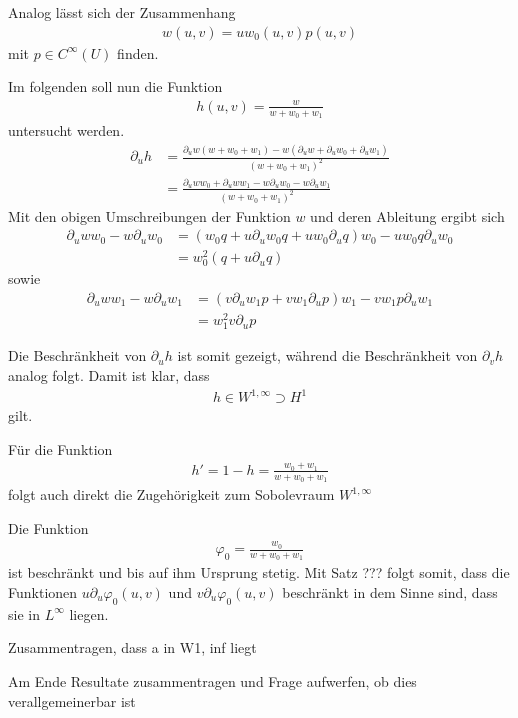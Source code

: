 \documentclass[10pt,a4paper,oneside]{report}
\begin{document}
Analog lässt sich der Zusammenhang
\begin{align*}
w\left(u,v\right) = u w_0\left(u,v\right) p\left(u,v\right)
\end{align*}
mit $p \in C^\infty\left(U\right)$ finden.

Im folgenden soll nun die Funktion
\begin{align*}
h\left(u,v\right) = \frac{w}{w + w_0 + w_1}
\end{align*}
untersucht werden.
\begin{align*}
\partial_u h &= \frac{\partial_u w \left(w+w_0+w_1\right) - w \left( \partial_u w + \partial_u w_0 +\partial_u w_1\right)}{\left(w+w_0+w_1\right)^2} \\
&= \frac{\partial_u w w_0+ \partial_u w w_1 - w \partial_u w_0 - w \partial_u w_1}{\left(w+w_0+w_1\right)^2}
\end{align*}
Mit den obigen Umschreibungen der Funktion $w$ und deren Ableitung ergibt sich
\begin{align*}
\partial_u w w_0 - w \partial_u w_0 &= \left(w_0 q + u \partial_u w_0 q +u w_0 \partial_u q \right) w_0 - u w_0 q \partial_u w_0 \\
&= w_0^2 \left(q+u\partial_u q\right)
\end{align*}
sowie 
\begin{align*}
\partial_u w w_1 - w \partial_u w_1 &= \left(v \partial_u w_1 p + v w_1 \partial_u p\right) w_1 - v w_1 p \partial_u w_1 \\
&= w_1^2 v \partial_u p
\end{align*}

Die Beschränkheit von $\partial_u h$ ist somit gezeigt, während die Beschränkheit von $\partial_v h$ analog folgt. 
Damit ist klar, dass
\begin{align*}
h \in W^{1, \infty} \supset H^1
\end{align*}
gilt.

Für die Funktion 
\begin{align*}
h' = 1 - h = \frac{w_0 + w_1}{w + w_0 +w_1}
\end{align*}
folgt auch direkt die Zugehörigkeit zum Sobolevraum $W^{1, \infty}$

Die Funktion 
\begin{align*}
\varphi_0 = \frac{w_0}{w + w_0 + w_1}
\end{align*}
ist beschränkt und bis auf ihm Ursprung stetig.
Mit Satz ??? folgt somit, dass die Funktionen $u \partial_u \varphi_0\left(u,v\right)$ und $v \partial_u \varphi_0\left(u,v\right)$ beschränkt in dem Sinne sind, dass sie in $L^{\infty}$ liegen.

Zusammentragen, dass
a in W1, inf liegt

Am Ende Resultate zusammentragen und Frage aufwerfen, ob dies verallgemeinerbar ist
\end{document}
